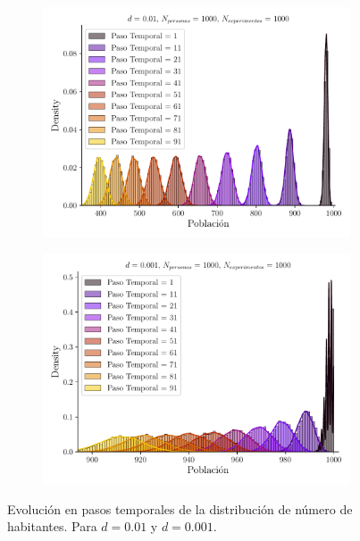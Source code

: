 \documentclass[twocolumn,aps,prl]{revtex4-1}
\begin{document}
\begin{figure}[ht!]
  \centering
  \begin{subfigure}[b]{0.49\linewidth}
      \centering
      \includegraphics[width = 0.999\textwidth]{figuras/ex01-a-evolucion_temporal.pdf}
      \label{fig:figuras/ex01-a-evolucion_temporal}
  \end{subfigure}
  \begin{subfigure}[b]{0.49\linewidth}
      \centering
      \includegraphics[width = 0.999\textwidth]{figuras/ex01-b-evolucion_temporal.pdf}
      \label{fig:figuras/ex01-b-evolucion_temporal}
  \end{subfigure}
  \caption{Evolución en pasos temporales de la distribución de número de habitantes. Para $d=0.01$ y $d=0.001$. }
  \label{fig:figuras/ex01-evolucion_temporal}
\end{figure}
\end{document}
